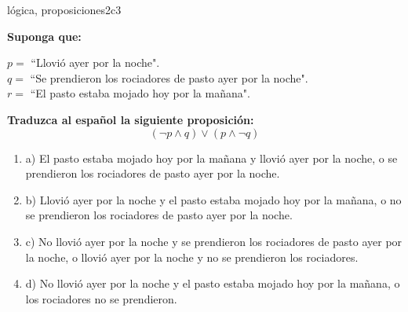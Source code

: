 \documentclass{article}
\begin{document}
\begin{question}{4}{lógica, proposiciones}{2}{c}{3}{
\textbf{Suponga que:} \medskip

\(p = \) ``Llovió ayer por la noche".\\
\(q = \) ``Se prendieron los rociadores de pasto ayer por la noche".\\
\(r = \) ``El pasto estaba mojado hoy por la mañana".\medskip

\textbf{Traduzca al español la siguiente proposición:}
\[
(\neg p \land q) \lor (p \land \neg q)
\]

\begin{enumerate}
   \item a) El pasto estaba mojado hoy por la mañana y llovió ayer por la noche, o se prendieron los rociadores de pasto ayer por la noche.
   \item b) Llovió ayer por la noche y el pasto estaba mojado hoy por la mañana, o no se prendieron los rociadores de pasto ayer por la noche.
   \item c) No llovió ayer por la noche y se prendieron los rociadores de pasto ayer por la noche, o llovió ayer por la noche y no se prendieron los rociadores.
   \item d) No llovió ayer por la noche y el pasto estaba mojado hoy por la mañana, o los rociadores no se prendieron.
\end{enumerate}
}
\end{question}
\end{document}
